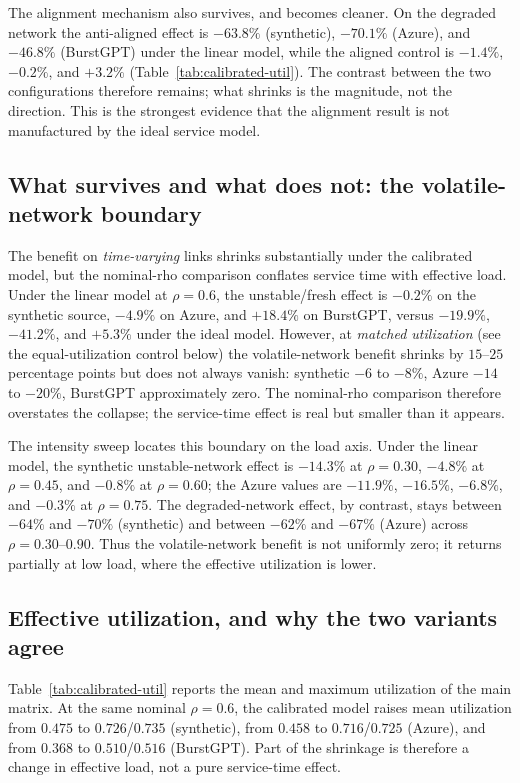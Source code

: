 The alignment mechanism also survives, and becomes cleaner. On the degraded network the
anti-aligned effect is $-63.8\%$ (synthetic), $-70.1\%$ (Azure), and $-46.8\%$ (BurstGPT) under the
linear model, while the aligned control is $-1.4\%$, $-0.2\%$, and $+3.2\%$ (Table~\ref{tab:calibrated-util}).
The contrast between the two configurations therefore remains; what shrinks is the magnitude, not
the direction. This is the strongest evidence that the alignment result is not manufactured by the
ideal service model.

\subsection{What survives and what does not: the volatile-network boundary}
The benefit on \emph{time-varying} links shrinks substantially under the calibrated model, but the
nominal-rho comparison conflates service time with effective load. Under the linear model at
$\rho=0.6$, the unstable/fresh effect is $-0.2\%$ on the synthetic source, $-4.9\%$ on Azure, and
$+18.4\%$ on BurstGPT, versus $-19.9\%$, $-41.2\%$, and $+5.3\%$ under the ideal model. However,
at \emph{matched utilization} (see the equal-utilization control below) the volatile-network
benefit shrinks by $15$--$25$ percentage points but does not always vanish: synthetic $-6$ to
$-8\%$, Azure $-14$ to $-20\%$, BurstGPT approximately zero. The nominal-rho comparison therefore
overstates the collapse; the service-time effect is real but smaller than it appears.

The intensity sweep locates this boundary on the load axis. Under the linear model, the synthetic
unstable-network effect is $-14.3\%$ at $\rho=0.30$, $-4.8\%$ at $\rho=0.45$, and $-0.8\%$ at
$\rho=0.60$; the Azure values are $-11.9\%$, $-16.5\%$, $-6.8\%$, and $-0.3\%$ at $\rho=0.75$.
The degraded-network effect, by contrast, stays between $-64\%$ and $-70\%$ (synthetic) and
between $-62\%$ and $-67\%$ (Azure) across $\rho=0.30$--$0.90$. Thus the volatile-network benefit
is not uniformly zero; it returns partially at low load, where the effective utilization is lower.

\subsection{Effective utilization, and why the two variants agree}
Table~\ref{tab:calibrated-util} reports the mean and maximum utilization of the main matrix. At the
same nominal $\rho=0.6$, the calibrated model raises mean utilization from $0.475$ to
$0.726$/$0.735$ (synthetic), from $0.458$ to $0.716$/$0.725$ (Azure), and from $0.368$ to
$0.510$/$0.516$ (BurstGPT). Part of the shrinkage is therefore a change in effective load, not a
pure service-time effect.

